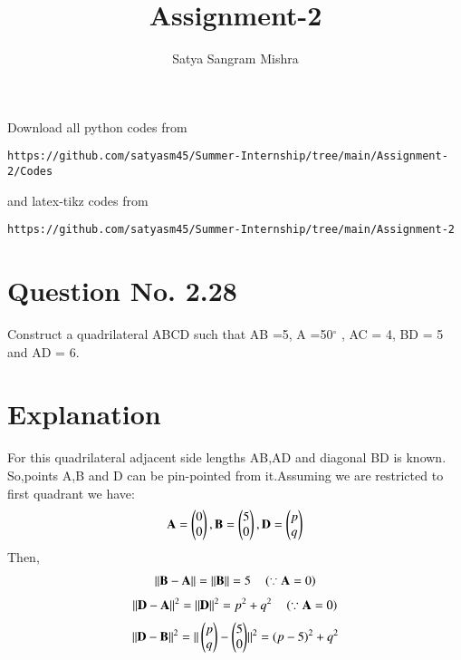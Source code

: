 \documentclass[journal,12pt,twocolumn]{IEEEtran}
\begin{document}
     \def\centbox#1{\makebox[0in]{#1}}
     \def\topbox#1{\raisebox{-\baselineskip}[0in][0in]{#1}}
     \def\midbox#1{\raisebox{-0.5\baselineskip}[0in][0in]{#1}}
\vspace{3cm}
\title{Assignment-2}
\author{Satya Sangram Mishra}
\maketitle
\newpage
\bigskip
\renewcommand{\thefigure}{\theenumi}
\renewcommand{\thetable}{\theenumi}
Download all python codes from 
\begin{lstlisting}
https://github.com/satyasm45/Summer-Internship/tree/main/Assignment-2/Codes
\end{lstlisting}
%
and latex-tikz codes from 
%
\begin{lstlisting}
https://github.com/satyasm45/Summer-Internship/tree/main/Assignment-2
\end{lstlisting}
%
\section{Question No. 2.28}
Construct a quadrilateral ABCD such that AB =5, \angle A =50$^\circ$
, AC = 4, BD = 5 and AD = 6.
%
\section{Explanation}
For this quadrilateral adjacent side lengths AB,AD and diagonal BD is known. So,points A,B and D can be pin-pointed from it.Assuming we are restricted to first quadrant we have:
\begin{align}
\mathbf{A} = \begin{pmatrix}0\\0\end{pmatrix}, \mathbf{B} = \begin{pmatrix}5\\0\end{pmatrix}, \mathbf{D} = \begin{pmatrix}p\\q\end{pmatrix}
\end{align}
Then,
\begin{align}
\Vert\mathbf{B}-\mathbf{A}\rVert = \Vert\mathbf{B}\rVert  = 5  \quad \left(\because \mathbf{A}=0\right)
\end{align}
\begin{align}
\Vert\mathbf{D}-\mathbf{A}\rVert^2 = \Vert\mathbf{D}\rVert^2  = p^2+q^2  \quad \left(\because \mathbf{A}=0\right)
\end{align}
\begin{align}
\Vert\mathbf{D}-\mathbf{B}\rVert^2 = \Vert\begin{pmatrix}p\\q\end{pmatrix}-\begin{pmatrix}5\\0\end{pmatrix}\rVert^2  = (p-5)^2+q^2  
\end{align}
\end{document}
